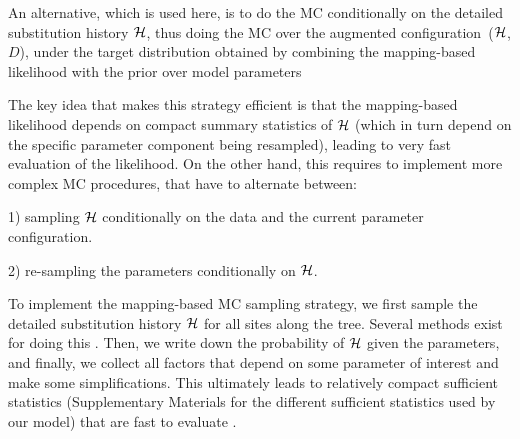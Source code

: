 An alternative, which is used here, is to do the \acrshort{MC} conditionally on the detailed \gls{substitution} history $\mathcal{H}$, thus doing the \acrshort{MC} over the augmented configuration~($\mathcal{H}$, $D$), under the target distribution obtained by combining the mapping-based \gls{likelihood} with the \gls{prior} over model parameters

The key idea that makes this strategy efficient is that the mapping-based \gls{likelihood} depends on
compact summary statistics of $\mathcal{H}$ (which in turn depend on the specific parameter component
being resampled), leading to very fast evaluation of the \gls{likelihood}.
On the other hand, this requires to implement more complex \acrshort{MC} procedures, that have to alternate between:

1) sampling $\mathcal{H}$ conditionally on the data and the current parameter configuration.

2) re-sampling the parameters conditionally on $\mathcal{H}$.

To implement the mapping-based \acrshort{MC} sampling strategy, we first sample the detailed \gls{substitution} history $\mathcal{H}$ for all sites along the tree.
Several methods exist for doing this \citep{Nielsen2002,Rodrigue2008}.
Then, we write down the probability of $\mathcal{H}$ given the parameters, and finally, we collect all factors that depend on some parameter of interest and make some simplifications.
This ultimately leads to relatively compact sufficient statistics (Supplementary Materials for the different sufficient statistics used by our model) that are fast to evaluate \citep{Irvahn2014,Davydov2016}.


